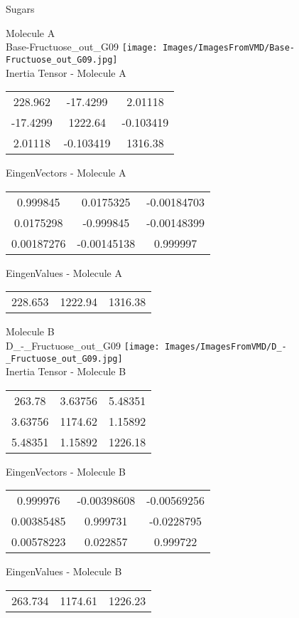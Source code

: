 \vtab[-2cm]
\begin{center}
{\large Sugars}
\end{center}
\begin{multicols}{2}
\begin{center}
Molecule A \\ 
Base-Fructuose\_out\_G09
\texttt{[image: Images/ImagesFromVMD/Base-Fructuose\_out\_G09.jpg]}
\\
Inertia Tensor - Molecule A \\
\vtab
\begin{tabular}{|c c c|}
228.962	 & 	-17.4299	 & 	2.01118	 \\
-17.4299	 & 	1222.64	 & 	-0.103419	 \\
2.01118	 & 	-0.103419	 & 	1316.38
\end{tabular}

\vtab
 EingenVectors - Molecule A     \\
\vtab
\begin{tabular}{|c c c|}
0.999845	 & 	0.0175325	 & 	-0.00184703	 \\
0.0175298	 & 	-0.999845	 & 	-0.00148399	 \\
0.00187276	 & 	-0.00145138	 & 	0.999997
\end{tabular}

\vtab
 EingenValues - Molecule A     \\
\vtab
\begin{tabular}{|c c c|}
228.653	 & 	1222.94	 & 	1316.38
\end{tabular}
\columnbreak

Molecule B \\ 
D\_-\_Fructuose\_out\_G09
\texttt{[image: Images/ImagesFromVMD/D\_-\_Fructuose\_out\_G09.jpg]}
\\
Inertia Tensor - Molecule B \\
\vtab
\begin{tabular}{|c c c|}
263.78	 & 	3.63756	 & 	5.48351	 \\
3.63756	 & 	1174.62	 & 	1.15892	 \\
5.48351	 & 	1.15892	 & 	1226.18
\end{tabular}

\vtab
 EingenVectors - Molecule B     \\
\vtab
\begin{tabular}{|c c c|}
0.999976	 & 	-0.00398608	 & 	-0.00569256	 \\
0.00385485	 & 	0.999731	 & 	-0.0228795	 \\
0.00578223	 & 	0.022857	 & 	0.999722
\end{tabular}

\vtab
 EingenValues - Molecule B     \\
\vtab
\begin{tabular}{|c c c|}
263.734	 & 	1174.61	 & 	1226.23
\end{tabular}

\end{center}
\end{multicols}
